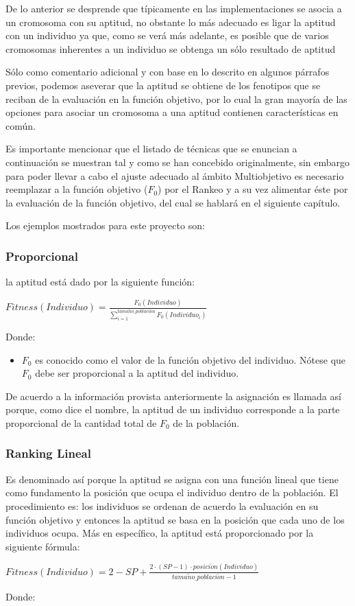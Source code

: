 \documentclass[class=report, crop=false]{standalone}
\begin{document}
De lo anterior se desprende que típicamente en las implementaciones
se asocia a un cromosoma con su aptitud, no obstante lo más adecuado
es ligar la aptitud con un individuo ya que, como se verá más 
adelante, es posible que de varios cromosomas inherentes a un individuo 
se obtenga un sólo resultado de aptitud 

Sólo como comentario adicional y con base en lo descrito en algunos 
párrafos previos, podemos aseverar que la aptitud se obtiene de los
fenotipos que se reciban de la evaluación en la función objetivo, 
por lo cual la gran mayoría de las opciones para asociar un cromosoma 
a una aptitud contienen características en común. 

Es importante mencionar que el listado de técnicas que se 
enuncian a continuación se muestran tal y como se han concebido 
originalmente, sin embargo para poder llevar a cabo el ajuste 
adecuado al ámbito Multiobjetivo es necesario reemplazar a la
función objetivo ($F_0$) por el Rankeo y a su vez alimentar éste 
por la evaluación de la función objetivo, del cual se hablará 
en el siguiente capítulo.\medskip\break

Los ejemplos mostrados para este proyecto son:

\subsubsection{Proporcional}
la aptitud está dado por la siguiente función:\medskip\break
\centerline{$Fitness(Individuo) = \frac{F_0(Individuo)}{\sum_{i=1}^{tama\tilde{n}o\_poblaci\acute{o}n}F_0(Individuo_i)}$}\medskip\break
Donde:

\begin{itemize}
\item $F_0$ es conocido como el valor de la función objetivo del 
individuo. Nótese que $F_0$ debe ser proporcional a la aptitud del 
individuo.
\end{itemize}

De acuerdo a la información provista anteriormente la asignación 
es llamada así porque, como dice el nombre, la aptitud de un 
individuo corresponde a la parte proporcional de la cantidad 
total de $F_0$ de la población.

\subsubsection{Ranking Lineal}
Es denominado así porque la aptitud se asigna con una función 
lineal que tiene como fundamento la posición que ocupa el 
individuo dentro de la población.\break
El procedimiento es: los individuos se ordenan de acuerdo 
la evaluación en su función objetivo y entonces la aptitud 
se basa en la posición que cada uno de los individuos ocupa. 
Más en específico, la aptitud está proporcionado por la 
siguiente fórmula:\medskip\break
\centerline{$Fitness(Individuo) = 2 - SP + \frac{2 \cdot (SP - 1) \cdot posici\acute{o}n(Individuo)}{tama\tilde{n}o\_poblaci\acute{o}n - 1}$}\medskip\break
Donde:
\end{document}
